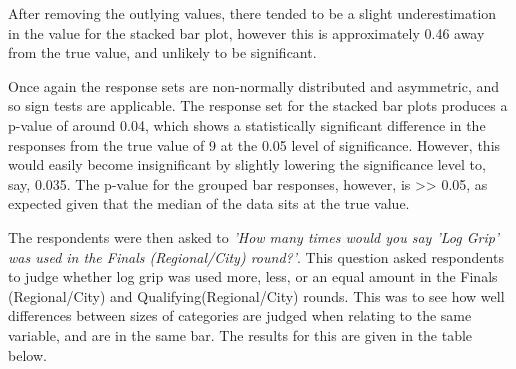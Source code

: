 \documentclass[
]{article}
\newenvironment{Shaded}{\begin{snugshade}}{\end{snugshade}}
\newcommand{\DecValTok}[1]{\textcolor[rgb]{0.00,0.00,0.81}{#1}}
\newcommand{\KeywordTok}[1]{\textcolor[rgb]{0.13,0.29,0.53}{\textbf{#1}}}
\newcommand{\NormalTok}[1]{#1}
\newcommand{\OperatorTok}[1]{\textcolor[rgb]{0.81,0.36,0.00}{\textbf{#1}}}
\newcommand{\StringTok}[1]{\textcolor[rgb]{0.31,0.60,0.02}{#1}}
\begin{document}
After removing the outlying values, there tended to be a slight
underestimation in the value for the stacked bar plot, however this is
approximately 0.46 away from the true value, and unlikely to be
significant.

Once again the response sets are non-normally distributed and
asymmetric, and so sign tests are applicable. The response set for the
stacked bar plots produces a p-value of around 0.04, which shows a
statistically significant difference in the responses from the true
value of 9 at the 0.05 level of significance. However, this would easily
become insignificant by slightly lowering the significance level to,
say, 0.035. The p-value for the grouped bar responses, however, is
\textgreater\textgreater{} 0.05, as expected given that the median of
the data sits at the true value.

The respondents were then asked to
\textit{'How many times would you say 'Log Grip' was used in the Finals (Regional/City) round?'}.
This question asked respondents to judge whether log grip was used more,
less, or an equal amount in the Finals (Regional/City) and
Qualifying(Regional/City) rounds. This was to see how well differences
between sizes of categories are judged when relating to the same
variable, and are in the same bar. The results for this are given in the
table below.

\begin{Shaded}
\end{Shaded}
\end{document}
